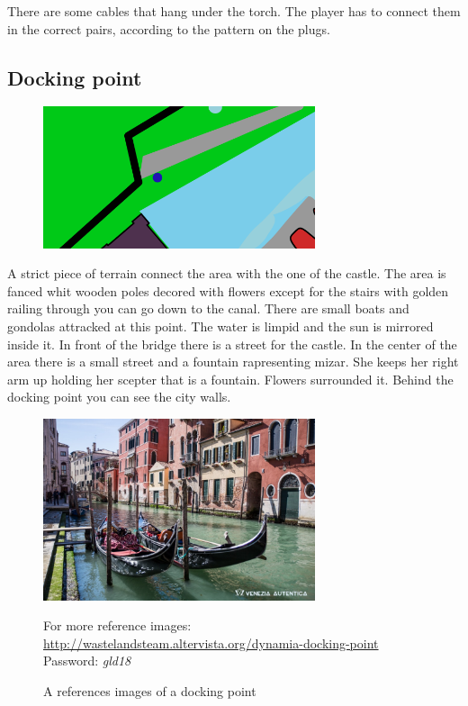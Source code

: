 There are some cables that hang under the torch. The player has to connect them in the correct pairs, according to the pattern on the plugs.

\subsection{Docking point}
\begin{figure}[H]
    \centering
    \includegraphics[width=8cm]{Images/Maps/dockingPoint}
  \end{figure}
A strict piece of terrain connect the area with the one of the castle. 
The area is fanced whit wooden poles decored with flowers except for the stairs with golden railing through you can go down to the canal.
There are small boats and gondolas attracked at this point. The water is limpid and the sun is mirrored inside it. 
In front of the bridge there is a street for the castle. 
In the center of the area there is a small street and a fountain rapresenting mizar. She keeps her right arm up holding her scepter that is a fountain. Flowers surrounded it. Behind the docking point you can see the city walls.
\begin{figure}[H]
    \centering
    \includegraphics[width=8cm]{Images/Landmarks/dockingPoint}
    \caption{A references images of a docking point}
    For more reference images: \href{http://wastelandsteam.altervista.org/dynamia-docking-point}{http://wastelandsteam.altervista.org/dynamia-docking-point}\\Password: \textit{gld18}
  \end{figure}
